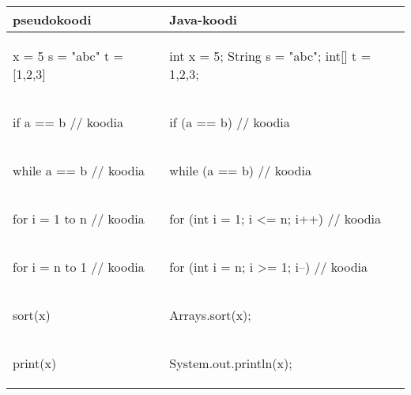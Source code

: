 \begin{table}
\center
\begin{tabular}{ll}
pseudokoodi & Java-koodi \\
\hline
\begin{smallcode}[xleftmargin=0pt]
x = 5
s = "abc"
t = [1,2,3]
\end{smallcode}
&
\begin{smallcode}
int x = 5;
String s = "abc";
int[] t = {1,2,3};
\end{smallcode}
\\
\begin{smallcode}[xleftmargin=0pt]
if a == b
    // koodia
\end{smallcode}
&
\begin{smallcode}
if (a == b) {
    // koodia
}
\end{smallcode}
\\
\begin{smallcode}[xleftmargin=0pt]
while a == b
    // koodia
\end{smallcode}
&
\begin{smallcode}
while (a == b) {
    // koodia
}
\end{smallcode}
\\
\begin{smallcode}[xleftmargin=0pt]
for i = 1 to n
    // koodia
\end{smallcode}
&
\begin{smallcode}
for (int i = 1; i <= n; i++) {
    // koodia
}
\end{smallcode}
\\
\begin{smallcode}[xleftmargin=0pt]
for i = n to 1
    // koodia
\end{smallcode}
&
\begin{smallcode}
for (int i = n; i >= 1; i--) {
    // koodia
}
\end{smallcode}
\\
\begin{smallcode}[xleftmargin=0pt]
sort(x)
\end{smallcode}
&
\begin{smallcode}
Arrays.sort(x);
\end{smallcode}
\\
\begin{smallcode}[xleftmargin=0pt]
print(x)
\end{smallcode}
&
\begin{smallcode}
System.out.println(x);
\end{smallcode}
\\

\end{tabular}
\end{table}
